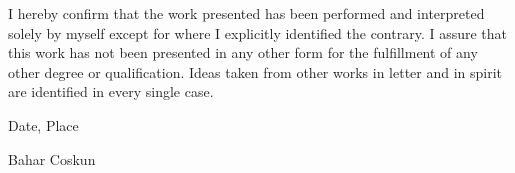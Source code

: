 I hereby confirm that the work presented has been performed and interpreted solely by myself except for where I explicitly identified the contrary. I assure that this work has not been presented in any other form for the fulfillment of any other degree or qualification. Ideas taken from other works in letter and in spirit are identified in every single case.\\
\vspace{2cm}




Date, Place\\
\vspace{1.5cm}






Bahar Coskun

